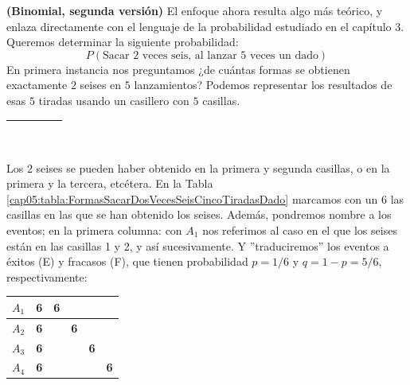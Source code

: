 \begin{Ejemplo}{\bf (Binomial, segunda versión)}\label{ejem:BinomialDosSeisesCuatroTiradasMarcos} El enfoque ahora
resulta algo más teórico, y enlaza directamente con el lenguaje de la probabilidad estudiado en el capítulo 3.
Queremos determinar la siguiente probabilidad:
            	\[P(\text{Sacar $2$ veces seis, al lanzar $5$ veces un dado})\]
            En primera instancia nos preguntamos ¿de cuántas formas se obtienen exactamente $2$ seises en $5$ lanzamientos? %
             Podemos representar los resultados de esas $5$ tiradas usando un casillero con $5$  casillas.
            \begin{center}
            \begin{tabular}{|c|c|c|c|c|}
            \hline
             \rule{0cm}{0.5cm}\rule{0.3cm}{0cm}&\rule{0.3cm}{0cm}&\rule{0.3cm}{0cm} &\rule{0.3cm}{0cm}
             &\rule{0.3cm}{0cm}\\
             \hline
             \end{tabular}
             \end{center}
             Los $2$ seises se pueden haber obtenido en la primera y segunda casillas, o en la primera y la tercera, etcétera.
    En la Tabla \ref{cap05:tabla:FormasSacarDosVecesSeisCincoTiradasDado} marcamos con un $6$ las casillas en las que se han obtenido los seises. Adem\'as, pondremos nombre a los eventos; en la primera columna: con $A_1$ nos referimos al caso en el que los seises están en las casillas 1 y 2, y así sucesivamente. Y  ''traduciremos'' los eventos a \'exitos (E) y fracasos (F), que tienen probabilidad $p=1/6$ y $q=1-p=5/6$, respectivamente:
    \begin{table}[htbp]
        \begin{center}
          \begin{tabular}{|c|c|c|c|c|c|}
            \hline
            $A_1$ &  \rule{0cm}{0.5cm}\mbox{\large\bf 6}&\mbox{\large\bf 6}& & & \\
            \hline
            $A_2$ &  \rule{0cm}{0.5cm}\mbox{\large\bf 6}&& \mbox{\large\bf 6}& & \\
            \hline
            $A_3$ &  \rule{0cm}{0.5cm}\mbox{\large\bf 6}&& &\mbox{\large\bf 6} & \\
            \hline
            $A_4$ &  \rule{0cm}{0.5cm}\mbox{\large\bf 6}&& & &\mbox{\large\bf 6} \\

\end{tabular}
\end{center}
\end{table}
\end{Ejemplo}
